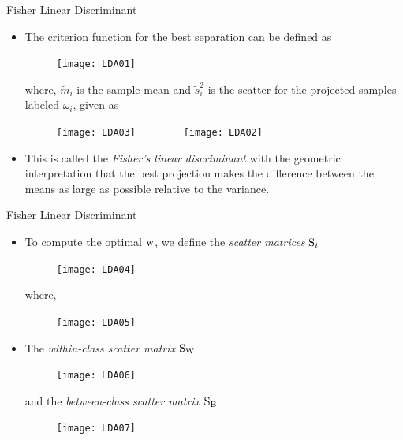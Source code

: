 \begin{frame}{Fisher Linear Discriminant}
\begin{itemize}
\item The criterion function for the best separation can be defined as
\begin{figure}
\texttt{[image: LDA01]}
\end{figure}
where, $\tilde{m}_i$ is the sample mean and $\tilde{s}_i^2$ is the scatter for the projected samples labeled $\omega_i$, given as
\begin{figure}
\texttt{[image: LDA03]}~~~~~~~~
\texttt{[image: LDA02]}
\end{figure}
\item This is called the \textit{\color{mycolor2}Fisher's linear discriminant} with the
geometric interpretation that the best projection makes the
difference between the means as large as possible relative
to the variance.
\end{itemize}
\end{frame}

\begin{frame}{Fisher Linear Discriminant}
\begin{itemize}
\item To compute the optimal ${\rm w}$, we define the \textit{\color{mycolor2}scatter matrices} ${\rm S}_i$
\begin{figure}
\texttt{[image: LDA04]}
\end{figure}
where,
\begin{figure}
\texttt{[image: LDA05]}
\end{figure}
\item The \textit{\color{mycolor2}within-class scatter matrix} ${\rm S_ W}$
\begin{figure}
\texttt{[image: LDA06]}
\end{figure}
and the \textit{\color{mycolor2}between-class scatter matrix} ${\rm S_B}$
\begin{figure}
\texttt{[image: LDA07]}
\end{figure}
\end{itemize}
\end{frame}

